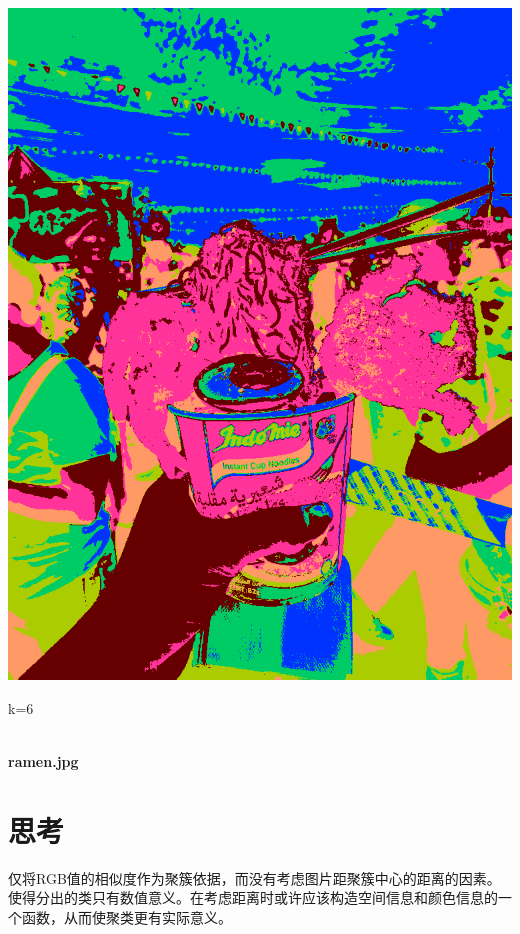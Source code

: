 \documentclass{article}
\begin{document}
\begin{newpage}
\begin{center}
\begin{minipage}{0.8\textwidth}
\begin{center}
\begin{minipage}{0.3\linewidth}
                \centerline{\includegraphics[width=\textwidth]{src/ramen_c6_output.png}}
                \centerline{k=6}
            \end{minipage}\\
            \textbf{ramen.jpg}\\
        \end{center}
    \end{minipage}
    \end{center}
\end{newpage}
\section{思考}
仅将RGB值的相似度作为聚簇依据，而没有考虑图片距聚簇中心的距离的因素。使得分出的类只有数值意义。在考虑距离时或许应该构造空间信息和颜色信息的一个函数，从而使聚类更有实际意义。
\end{document}
